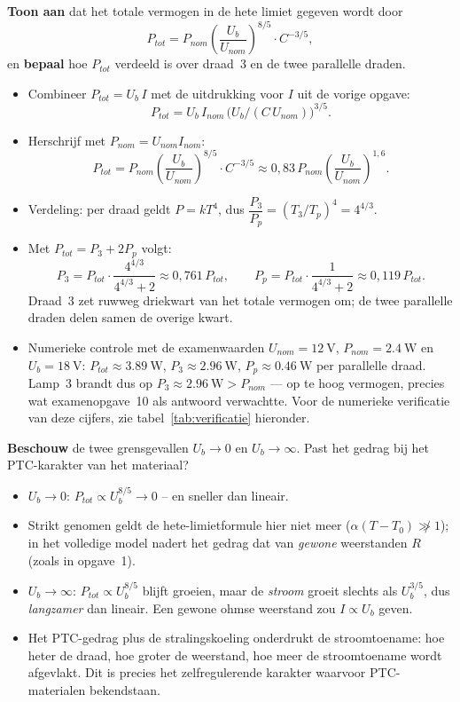 \documentclass[addpoints,11pt,a4paper]{exam}
\begin{document}
\begin{questions}
\newpage
\question[5]
\textbf{Toon aan} dat het totale vermogen in de hete limiet gegeven wordt door
\[
P_{tot} = P_{nom}\!\left(\frac{U_b}{U_{nom}}\right)^{\!8/5}\!\cdot C^{-3/5},
\]
en \textbf{bepaal} hoe $P_{tot}$ verdeeld is over draad~3 en de twee parallelle draden.

\begin{solution}
\begin{itemize}
  \item Combineer $P_{tot} = U_b\,I$ met de uitdrukking voor $I$ uit de vorige opgave:
    \[P_{tot} = U_b\,I_{nom}\,\bigl(U_b/(C\,U_{nom})\bigr)^{3/5}.\]
  \item Herschrijf met $P_{nom} = U_{nom}I_{nom}$:
    \[P_{tot} = P_{nom}\!\left(\frac{U_b}{U_{nom}}\right)^{\!8/5}\!\cdot C^{-3/5}\approx 0{,}83\,P_{nom}\!\left(\frac{U_b}{U_{nom}}\right)^{\!1{,}6}.\]
  \item Verdeling: per draad geldt $P = kT^4$, dus $\dfrac{P_3}{P_p} = (T_3/T_p)^4 = 4^{4/3}$.
  \item Met $P_{tot} = P_3 + 2P_p$ volgt:
    \[P_3 = P_{tot}\cdot\dfrac{4^{4/3}}{4^{4/3}+2} \approx 0{,}761\,P_{tot},
      \qquad P_p = P_{tot}\cdot\dfrac{1}{4^{4/3}+2} \approx 0{,}119\,P_{tot}.\]
    Draad~3 zet ruwweg driekwart van het totale vermogen om; de twee parallelle draden delen samen de overige kwart.
  \item Numerieke controle met de examenwaarden $U_{nom} = \qty{12}{\V}$, $P_{nom} = \qty{2.4}{\W}$ en $U_b = \qty{18}{\V}$: $P_{tot} \approx \qty{3.89}{\W}$, $P_3 \approx \qty{2.96}{\W}$, $P_p \approx \qty{0.46}{\W}$ per parallelle draad. Lamp~3 brandt dus op $P_3 \approx \qty{2.96}{\W} > P_{nom}$ --- op te hoog vermogen, precies wat examenopgave~10 als antwoord verwachtte. Voor de numerieke verificatie van deze cijfers, zie tabel~\ref{tab:verificatie} hieronder.
\end{itemize}
\end{solution}

\question[4]
\textbf{Beschouw} de twee grensgevallen $U_b \to 0$ en $U_b \to \infty$. Past het gedrag bij het PTC-karakter van het materiaal?

\begin{solution}
\begin{itemize}
  \item $U_b \to 0$: $P_{tot} \propto U_b^{8/5} \to 0$ -- en sneller dan lineair.
  \item Strikt genomen geldt de hete-limietformule hier niet meer ($\alpha(T-T_0) \not\gg 1$); in het volledige model nadert het gedrag dat van \emph{gewone} weerstanden $R$ (zoals in opgave~1).
  \item $U_b \to \infty$: $P_{tot} \propto U_b^{8/5}$ blijft groeien, maar de \emph{stroom} groeit slechts als $U_b^{3/5}$, dus \emph{langzamer} dan lineair. Een gewone ohmse weerstand zou $I \propto U_b$ geven.
  \item Het PTC-gedrag plus de stralingskoeling onderdrukt de stroomtoename: hoe heter de draad, hoe groter de weerstand, hoe meer de stroomtoename wordt afgevlakt. Dit is precies het zelfregulerende karakter waarvoor PTC-materialen bekendstaan.
\end{itemize}
\end{solution}


\end{questions}
\end{document}
